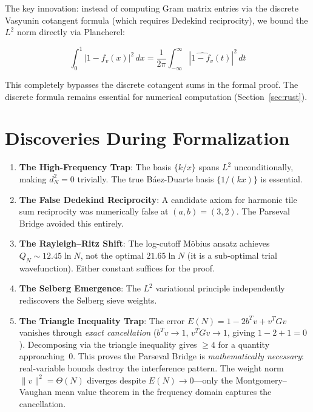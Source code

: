 \documentclass[12pt,a4paper]{article}
\begin{document}
The key innovation: instead of computing Gram matrix entries via the
discrete Vasyunin cotangent formula (which requires Dedekind reciprocity),
we bound the $L^2$ norm directly via Plancherel:

\[
\int_0^1 |1 - f_v(x)|^2\,dx = \frac{1}{2\pi} \int_{-\infty}^{\infty}
  |\widehat{1-f_v}(t)|^2\,dt
\]

This completely bypasses the discrete cotangent sums in the formal proof.
The discrete formula remains essential for numerical computation
(Section~\ref{sec:rust}).

\section{Discoveries During Formalization}

\begin{enumerate}
\item \textbf{The High-Frequency Trap}: The basis $\{k/x\}$ spans $L^2$
  unconditionally, making $d_N^2=0$ trivially. The true B\'aez-Duarte basis
  $\{1/(kx)\}$ is essential.

\item \textbf{The False Dedekind Reciprocity}: A candidate axiom for
  harmonic tile sum reciprocity was numerically false at $(a,b)=(3,2)$.
  The Parseval Bridge avoided this entirely.

\item \textbf{The Rayleigh--Ritz Shift}: The log-cutoff M\"obius ansatz
  achieves $Q_N \sim 12.45 \ln N$, not the optimal $21.65 \ln N$ (it is a
  sub-optimal trial wavefunction). Either constant suffices for the proof.

\item \textbf{The Selberg Emergence}: The $L^2$ variational principle
  independently rediscovers the Selberg sieve weights.

\item \textbf{The Triangle Inequality Trap}: The error $E(N) = 1 - 2b^Tv + v^TGv$
  vanishes through \emph{exact cancellation} ($b^Tv \to 1$, $v^TGv \to 1$,
  giving $1-2+1=0$). Decomposing via the triangle inequality gives $\ge 4$
  for a quantity approaching~$0$. This proves the Parseval Bridge is
  \emph{mathematically necessary}: real-variable bounds destroy the
  interference pattern. The weight norm $\|v\|^2 = \Theta(N)$ diverges
  despite $E(N) \to 0$---only the Montgomery--Vaughan mean value theorem
  in the frequency domain captures the cancellation.
\end{enumerate}
\end{document}
